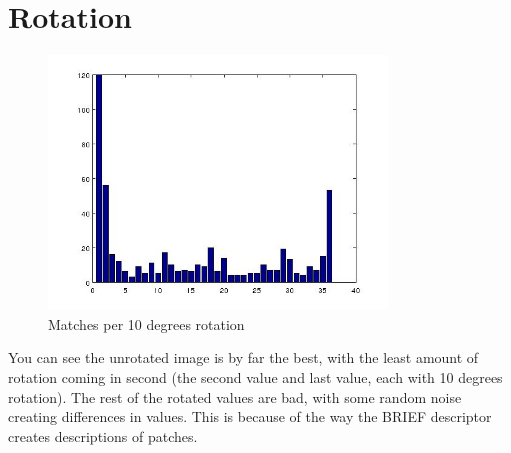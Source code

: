 \documentclass[11pt]{article}
\begin{document}
\section*{Rotation}
\begin{figure}[H]
\centering
\includegraphics[width=90mm]{rotation_bar_chart.jpg}
\caption{Matches per 10 degrees rotation}
\end{figure}

You can see the unrotated image is by far the best, with the least amount of rotation coming in second (the second value and last value, each with 10 degrees rotation). The rest of the rotated values are bad, with some random noise creating differences in values. This is because of the way the BRIEF descriptor creates descriptions of patches. 
\end{document}
